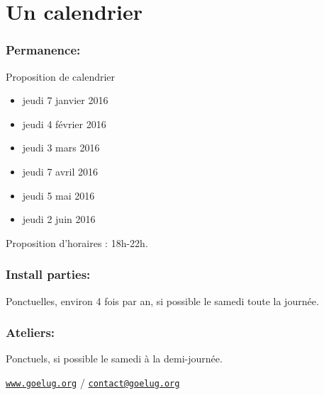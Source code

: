\documentclass[
bibliography=totoc,
headings=big,
captions=tableheading,
chapterprefix=true%
]{scrreprt}
\begin{document}
\section*{Un calendrier}

\begin{multicols}{2}

\subsubsection*{Permanence:}

Proposition de calendrier

\begin{itemize}

\item jeudi 7 janvier 2016

\item jeudi 4 février 2016

\item jeudi 3 mars 2016 

\item jeudi 7 avril 2016 

\item jeudi 5 mai 2016

\item jeudi 2 juin 2016

\end{itemize}

Proposition d'horaires : 18h-22h.

\columnbreak

\subsubsection*{Install parties:}

Ponctuelles, environ 4 fois par an, si possible le samedi toute la journée.

\subsubsection*{Ateliers:}

Ponctuels, si possible le samedi à la demi-journée.

\end{multicols}
\hfill \href{http://www.goelug.org/}{\tt www.goelug.org} / \href{mailto:contact@goelug.org}{\tt contact@goelug.org}
\end{document}
